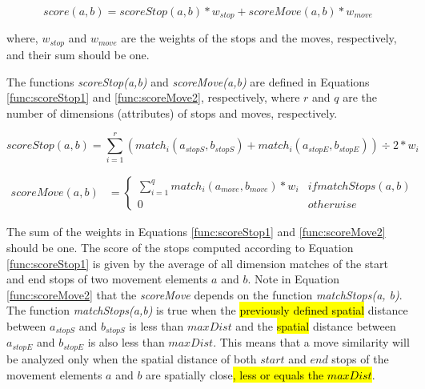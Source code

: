 \documentclass[12pt]{article}
\begin{document}
\begin{equation}
\label{func:score1}
score(a, b) = scoreStop(a, b) * w_{stop} + scoreMove(a, b) * w_{move}  
\end{equation}

where, $w_{stop}$ and $w_{move}$ are the weights of the stops and the moves, respectively, and their sum should be one.

The functions \emph{scoreStop(a,b)} and \emph{scoreMove(a,b)} are defined in Equations \ref{func:scoreStop1} and \ref{func:scoreMove2}, respectively, where $r$ and $q$ are the number of dimensions (attributes) of stops and moves, respectively.


\begin{equation}
\label{func:scoreStop1}
  scoreStop(a, b) = \sum\limits_{i=1}^r (match_i(a_{stopS}, b_{stopS}) + match_i(a_{stopE}, b_{stopE}))\div 2* w_{i}
\end{equation}


\begin{equation}
\label{func:scoreMove2}
\begin{split}
scoreMove(a, b)  & = 
  \begin{cases} 
      \sum\limits_{i=1}^q match_i(a_{move}, b_{move}) * w_{i} & if matchStops(a, b)\\
      0 & otherwise
  \end{cases}
\end{split}
\end{equation}


The sum of the weights in Equations \ref{func:scoreStop1} and \ref{func:scoreMove2} should be one.
The score of the stops computed according to Equation \ref{func:scoreStop1} is given by the average of all dimension matches of the start and end stops of two movement elements $a$ and $b$. Note in Equation \ref{func:scoreMove2} that the \emph{scoreMove} depends on the function \textit{matchStops(a, b)}.
The function \emph{matchStops(a,b)} is true when the \hl{previously defined spatial} distance between $a_{stopS}$ and $b_{stopS}$ is less than $maxDist$ and the \hl{spatial} distance between $a_{stopE}$ and $b_{stopE}$ is also less than $maxDist$. This means that a move similarity will be analyzed only when the spatial distance of both $start$ and $end$ stops of the movement elements $a$ and $b$ are spatially close\hl{, less or equals the $maxDist$}.
\end{document}
